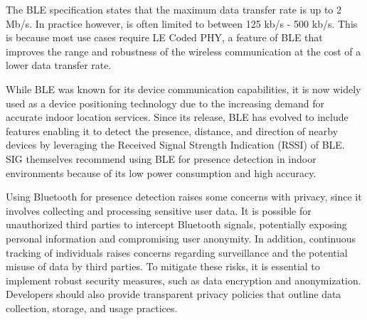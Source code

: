 The BLE specification states that the maximum data transfer rate is up to 2 Mb/s.
In practice however, is often limited to between 125 kb/s - 500 kb/s.
This is because most use cases require LE Coded PHY, a feature of BLE that improves the range and robustness of the wireless communication at the cost of a lower data transfer rate.\cite{BluetoothOverview}\cite{BLE_Regulatory_Aspects_Document}

While BLE was known for its device communication capabilities, it is now widely used as a device positioning technology due to the increasing demand for accurate indoor location services.
Since its release, BLE has evolved to include features enabling it to detect the presence, distance, and direction of nearby devices by leveraging the Received Signal Strength Indication (RSSI) of BLE.
SIG themselves recommend using BLE for presence detection in indoor environments because of its low power consumption and high accuracy.\cite{BluetoothOverview}\cite{BLE_Regulatory_Aspects_Document}

Using Bluetooth for presence detection raises some concerns with privacy, since it involves collecting and processing sensitive user data.
It is possible for unauthorized third parties to intercept Bluetooth signals, potentially exposing personal information and compromising user anonymity.
In addition, continuous tracking of individuals raises concerns regarding surveillance and the potential misuse of data by third parties. 
To mitigate these risks, it is essential to implement robust security measures, such as data encryption and anonymization.
Developers should also provide transparent privacy policies that outline data collection, storage, and usage practices.\cite{BluetoothPrivacy}\cite{BLE_Security}